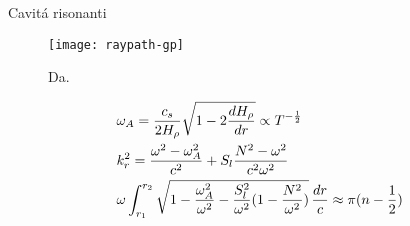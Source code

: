 \documentclass[10pt,xcolor={usenames},fleqn,mathserif,serif]{beamer}
\begin{document}
\begin{frame}{Cavit\'a risonanti}



\begin{figure}[!ht]
\centering
\texttt{[image: raypath-gp]}
\caption{Da\cite{gou91seismic}.}
\end{figure}
\begin{align*}
&\omega_A=\frac{c_s}{2\densityscale{}}\sqrt{1-2\TDy{r}{\densityscale{}}}\propto T\expy{-\frac{1}{2}}\\%
&k_r^2=\frac{\omega^2-\omega_A^2}{c^2}+S_l\frac{N^2-\omega^2}{c^2\omega^2}\\%
&\omega\int_{r_1}^{r_2}\sqrt{1-\frac{\omega_A^2}{\omega^2}-\frac{S_l^2}{\omega^2}(1-\frac{N^2}{\omega^2})}\,\frac{dr}{c}\approx\pi(n-\frac{1}{2})%
\end{align*}

\end{frame}
\end{document}
